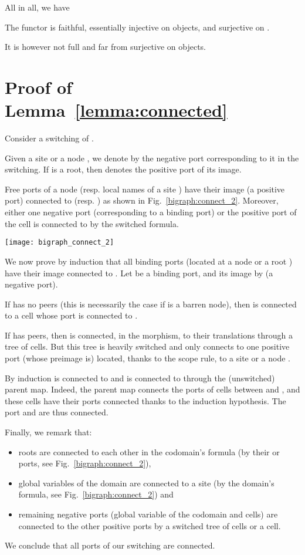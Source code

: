 \documentclass{llncs}
\begin{document}
All in all, we have 
\begin{theorem}\label{thm:conservative}
  The functor  is faithful, essentially
  injective on objects, and surjective on .
\end{theorem}
It is however not full and far from surjective on objects.




\appendix


\section{Proof of Lemma~\ref{lemma:connected}}
Consider a switching of .

Given a site or a node , we denote by  the 
negative  port corresponding to it in the switching. If  is
a root, then  denotes the positive  port of its
image.

Free ports of a node  (resp. local names of a site ) have
their image (a positive  port) connected to 
(resp. ) as shown in Fig.~\ref{bigraph:connect_2}.
Moreover, either one negative  port (corresponding to
a binding port) or the positive  port of the cell  is
connected to  by the switched formula.
\begin{figure*}[th] \centering
  \texttt{[image: bigraph\_connect\_2]}
  \caption{Domain, codomain and a node of a switching.}
  \label{bigraph:connect_2}
\end{figure*}

We now prove by induction that all binding ports (located at a
node or a root ) have their image connected to .  Let
 be a binding port, and  its image by  (a
negative  port).

If  has no peers (this is necessarily the case if  is a
barren node), then  is connected to a  cell whose 
port is connected to .

If  has peers, then  is connected, in the morphism, to
their translations through a tree of  cells.  But this tree is
heavily switched and only connects  to one
positive  port  (whose preimage is) located, thanks to the
scope rule, to a site or a node .

By induction  is connected to  and  is connected to
 through the (unswitched) parent map. 
Indeed, the parent map connects the  ports of cells between  and
, and these cells have their  ports connected thanks to the induction
hypothesis.
The port  and  are thus connected. 

Finally, we remark that:
\begin{itemize}
\item roots are connected to each other in the codomain's formula (by their 
  or  ports, see Fig.~\ref{bigraph:connect_2}), 
\item global variables of the domain are connected to a site (by the domain's formula, see Fig.~\ref{bigraph:connect_2}) and
\item remaining negative  ports (global variable
  of the codomain and  cells) are connected to the other
  positive ports by a switched tree of  cells or a
   cell.
\end{itemize}
We conclude that all ports of our switching are connected.
\end{document}
